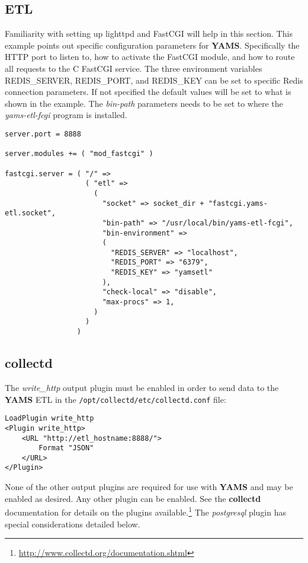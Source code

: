 \documentclass[a4paper,twoside,12pt]{article}
\begin{document}
\subsection{ETL}

Familiarity with setting up lighttpd and FastCGI will help in this section.
This example points out specific configuration parameters for \textbf{YAMS}.
Specifically the HTTP port to listen to, how to activate the FastCGI module,
and how to route all requests to the C FastCGI service.  The three environment
variables REDIS\_SERVER, REDIS\_PORT, and REDIS\_KEY can be set to specific
Redis connection parameters.  If not specified the default values will be set
to what is shown in the example.  The \textit{bin-path} parameters needs to be
set to where the \textit{yams-etl-fcgi} program is installed.

\lstset{language=clean}
\begin{lstlisting}
server.port = 8888

server.modules += ( "mod_fastcgi" )

fastcgi.server = ( "/" =>
                   ( "etl" =>
                     (
                       "socket" => socket_dir + "fastcgi.yams-etl.socket",
                       "bin-path" => "/usr/local/bin/yams-etl-fcgi",
                       "bin-environment" =>
                       (
                         "REDIS_SERVER" => "localhost",
                         "REDIS_PORT" => "6379",
                         "REDIS_KEY" => "yamsetl"
                       ),
                       "check-local" => "disable",
                       "max-procs" => 1,
                     )
                   )
                 )
\end{lstlisting}

\subsection{collectd}

The \textit{write\_http} output plugin must be enabled in order to send data to
the \textbf{YAMS} ETL in the \texttt{/opt/collectd/etc/collectd.conf} file:
\lstset{language=xml}
\begin{lstlisting}
LoadPlugin write_http
<Plugin write_http>
    <URL "http://etl_hostname:8888/">
        Format "JSON"
    </URL>
</Plugin>
\end{lstlisting}

None of the other output plugins are required for use with \textbf{YAMS} and
may be enabled as desired.  Any other plugin can be enabled.  See the
\textbf{collectd} documentation for details on the plugins
available.\footnote{\url{http://www.collectd.org/documentation.shtml}}  The
\textit{postgresql} plugin has special considerations detailed below.
\end{document}
